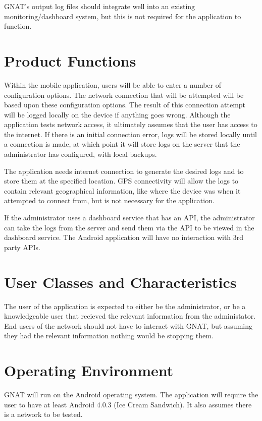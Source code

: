 \documentclass{scrreprt}
\begin{document}
GNAT's output log files should integrate well into an existing monitoring/dashboard system, but this is not required for the application to function.


\section{Product Functions}

Within the mobile application, users will be able to enter a number of configuration options.  The network connection that will be attempted will be based upon these configuration options.  The result of this connection attempt will be logged locally on the device if anything goes wrong. Although the application tests network access, it ultimately assumes that the user has access to the internet.  If there is an initial connection error, logs will be stored locally until a connection is made, at which point it will store logs on the server that the administrator has configured, with local backups.

The application needs internet connection to generate the desired logs and to store them at the specified location. GPS connectivity will allow the logs to contain relevant geographical information, like where the device was when it attempted to connect from, but is not necessary for the application.

If the administrator uses a dashboard service that has an API, the administrator can take the logs from the server and send them via the API to be viewed in the dashboard service. The Android application will have no interaction with 3rd party APIs.
 
\section{User Classes and Characteristics}
The user of the application is expected to either be the administrator, or be a knowledgeable user that recieved the relevant information from the administator.  End users of the network should not have to interact with GNAT, but assuming they had the relevant information nothing would be stopping them.

\section{Operating Environment}
GNAT will run on the Android operating system.  The application will require the user to have at least Android 4.0.3 (Ice Cream Sandwich). It also assumes there is a network to be tested.
\end{document}
